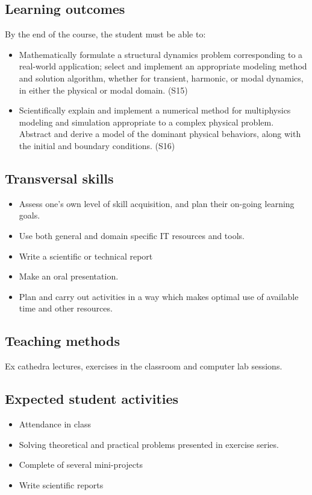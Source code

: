 \documentclass[11pt]{amsart}
\begin{document}
\subsection*{Learning outcomes}
By the end of the course, the student must be able to:
\begin{itemize}
\item Mathematically formulate a structural dynamics problem corresponding to a real-world application; select and implement an appropriate modeling method and solution algorithm, whether for transient, harmonic, or modal dynamics, in either the physical or modal domain. (S15)
\item Scientifically explain and implement a numerical method for multiphysics modeling and simulation appropriate to a complex physical problem. Abstract and derive a model of the dominant physical behaviors, along with the initial and boundary conditions. (S16)
\end{itemize}

\subsection*{Transversal skills}
\begin{itemize}
\item Assess one's own level of skill acquisition, and plan their on-going learning goals.
\item Use both general and domain specific IT resources and tools.
\item Write a scientific or technical report
\item Make an oral presentation.
\item Plan and carry out activities in a way which makes optimal use of available time and other resources.
\end{itemize}

\subsection*{Teaching methods}
Ex cathedra lectures, exercises in the classroom and computer lab sessions.

\subsection*{Expected student activities}
\begin{itemize}
\item Attendance in class
\item Solving theoretical and practical problems presented in exercise series.
\item Complete of several mini-projects
\item Write scientific reports
\end{itemize}
	
\end{document}
